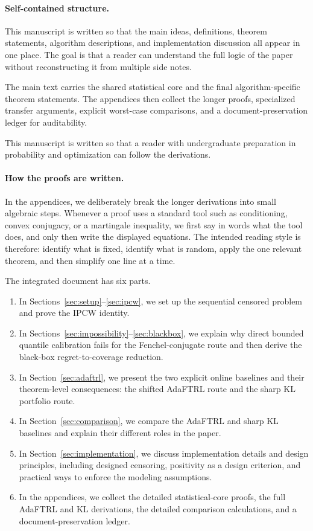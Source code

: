 \documentclass[11pt]{article}
\newcommand{\1}{\mathbf{1}}
\begin{document}
\paragraph{Self-contained structure.} This manuscript is written so that the main ideas, definitions, theorem statements, algorithm descriptions, and implementation discussion all appear in one place. The goal is that a reader can understand the full logic of the paper without reconstructing it from multiple side notes.

The main text carries the shared statistical core and the final algorithm-specific theorem statements. The appendices then collect the longer proofs, specialized transfer arguments, explicit worst-case comparisons, and a document-preservation ledger for auditability.

This manuscript is written so that a reader with undergraduate preparation in probability and optimization can follow the derivations.

\paragraph{How the proofs are written.} In the appendices, we deliberately break the longer derivations into small algebraic steps. Whenever a proof uses a standard tool such as conditioning, convex conjugacy, or a martingale inequality, we first say in words what the tool does, and only then write the displayed equations. The intended reading style is therefore: identify what is fixed, identify what is random, apply the one relevant theorem, and then simplify one line at a time.

The integrated document has six parts.
\begin{enumerate}[leftmargin=*,itemsep=2pt]
  \item In Sections~\ref{sec:setup}--\ref{sec:ipcw}, we set up the sequential censored problem and prove the IPCW identity.
  \item In Sections~\ref{sec:impossibility}--\ref{sec:blackbox}, we explain why direct bounded quantile calibration fails for the Fenchel-conjugate route and then derive the black-box regret-to-coverage reduction.
  \item In Section~\ref{sec:adaftrl}, we present the two explicit online baselines and their theorem-level consequences: the shifted AdaFTRL route and the sharp KL portfolio route.
  \item In Section~\ref{sec:comparison}, we compare the AdaFTRL and sharp KL baselines and explain their different roles in the paper.
  \item In Section~\ref{sec:implementation}, we discuss implementation details and design principles, including designed censoring, positivity as a design criterion, and practical ways to enforce the modeling assumptions.
  \item In the appendices, we collect the detailed statistical-core proofs, the full AdaFTRL and KL derivations, the detailed comparison calculations, and a document-preservation ledger.
\end{enumerate}
\end{document}
